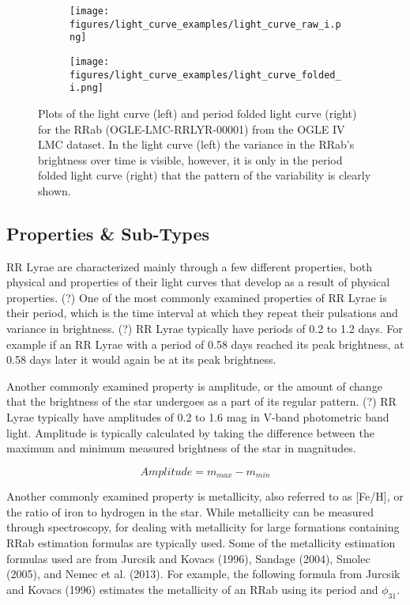 \documentclass[]{article}
\begin{document}
\begin{figure}
	\centering
	\begin{subfigure}{.5\textwidth}
		\centering
		\texttt{[image: figures/light\_curve\_examples/light\_curve\_raw\_i.png]}
		\label{fig:light_curve_raw_i}
	\end{subfigure}%
	\begin{subfigure}{.5\textwidth}
		\centering
		\texttt{[image: figures/light\_curve\_examples/light\_curve\_folded\_i.png]}
		\label{fig:sub2}
	\end{subfigure}
	\caption{Plots of the light curve (left) and period folded light curve (right) for the RRab (OGLE-LMC-RRLYR-00001) from the OGLE IV LMC dataset. In the light curve (left) the variance in the RRab’s brightness over time is visible, however, it is only in the period folded light curve (right) that the pattern of the variability is clearly shown.}
	\label{fig:light_curves}
\end{figure}

\subsection{Properties \& Sub-Types}

RR Lyrae are characterized mainly through a few different properties, both physical and properties of their light curves that develop as a result of physical properties. (?) One of the most commonly examined properties of RR Lyrae is their period, which is the time interval at which they repeat their pulsations and variance in brightness. (?) RR Lyrae typically have periods of 0.2 to 1.2 days. \cite{szczygiel_2009} For example if an RR Lyrae with a period of 0.58 days reached its peak brightness, at 0.58 days later it would again be at its peak brightness.

Another commonly examined property is amplitude, or the amount of change that the brightness of the star undergoes as a part of its regular pattern. (?) RR Lyrae typically have amplitudes of 0.2 to 1.6 mag in V-band photometric band light. \cite{szczygiel_2009} Amplitude is typically calculated by taking the difference between the maximum and minimum measured brightness of the star in magnitudes. \cite{richards_2011}

$$
Amplitude = m_{max} - m_{min}
$$

Another commonly examined property is metallicity, also referred to as [Fe/H], or the ratio of iron to hydrogen in the star. \cite{jurcsik_1995} While metallicity can be measured through spectroscopy, for dealing with metallicity for large formations containing RRab estimation formulas are typically used. Some of the metallicity estimation formulas used are from Jurcsik and Kovacs (1996), Sandage (2004), Smolec (2005), and Nemec et al. (2013). \cite{jurcsik_1996, sandage_2004, smolec_2005, nemec_2013} For example, the following formula from Jurcsik and Kovacs (1996) estimates the metallicity of an RRab using its period and $\phi_{31}$. \cite{jurcsik_1996}
\end{document}
